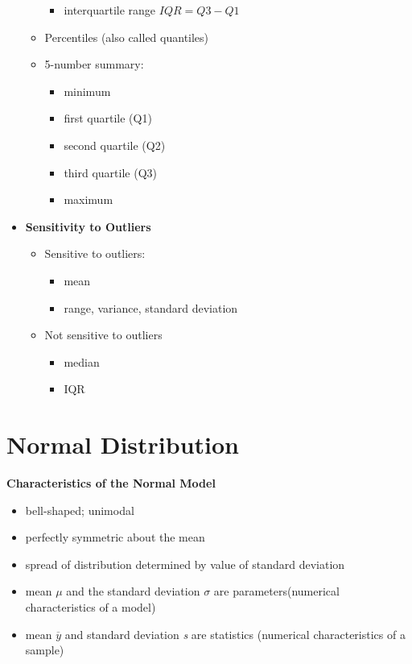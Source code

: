 \documentclass{article}
\begin{document}
\begin{itemize}
\begin{itemize}
\begin{itemize}
            \item interquartile range \begin{math}IQR = Q3 - Q1\end{math}
        \end{itemize}
        \item Percentiles (also called quantiles)
        \item 5-number summary:
        \begin{itemize}
            \item minimum
            \item first quartile (Q1)
            \item second quartile (Q2)
            \item third quartile (Q3)
            \item maximum
        \end{itemize}
    \end{itemize}
    \item \textbf{Sensitivity to Outliers}
    \begin{itemize}
        \item Sensitive to outliers:
        \begin{itemize}
            \item mean
            \item range, variance, standard deviation
        \end{itemize}
        \item Not sensitive to outliers
        \begin{itemize}
            \item median
            \item IQR
        \end{itemize}
    \end{itemize}

\end{itemize}

\section{Normal Distribution}

\textbf{Characteristics of the Normal Model}
\begin{itemize}
    \item bell-shaped; unimodal
    \item perfectly symmetric about the mean
    \item spread of distribution determined by value of standard deviation
    \item mean \begin{math}\mu\end{math} and the standard deviation \begin{math}\sigma\end{math} are parameters(numerical characteristics of a model)
    \item mean \begin{math}\overline{y}\end{math} and standard deviation \emph{s} are statistics (numerical characteristics of a sample)
\end{itemize}
\end{document}

